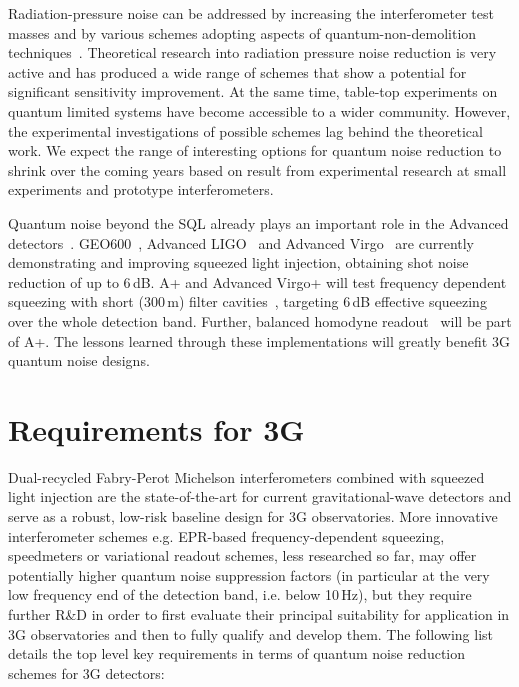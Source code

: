 Radiation-pressure noise can be addressed by increasing the interferometer test masses and by various schemes adopting aspects of quantum-non-demolition techniques~\cite{KLMTV2001,PuCh2002,Che2003,Braginsky:2004fp}. Theoretical research into radiation pressure noise reduction is very active and has produced a wide range of schemes that show a potential for significant sensitivity improvement. At the same time, table-top experiments on quantum limited systems have become accessible to a wider community. However, the experimental investigations of possible schemes lag behind the theoretical work. We expect the range of interesting options for quantum noise reduction to shrink over the coming years based on result from experimental research at small experiments and prototype interferometers.

Quantum noise beyond the SQL already plays an important role in the Advanced detectors~\cite{BuCh2001}. GEO600~\cite{GEO:Squeezing}, Advanced LIGO~\cite{H1:Squeezing,AdvancedLIGO2015} and Advanced Virgo~\cite{AdvancedVirgo2015} are currently demonstrating and improving squeezed light injection, obtaining shot noise reduction of up to 6\,dB. A+ and Advanced Virgo+ will test frequency dependent squeezing with short (300\,m) filter cavities~\cite{Eva2013,TAMA_FDS2016}, targeting 6\,dB effective squeezing over the whole detection band. Further, balanced homodyne readout~\cite{BHD,Stefszky:Balanced2012} will be part of A+. The lessons learned through these implementations will greatly benefit 3G quantum noise designs.

\section{Requirements for 3G}
Dual-recycled Fabry-Perot Michelson interferometers combined with squeezed light injection are the state-of-the-art for current gravitational-wave detectors and serve as a robust, low-risk baseline design for 3G observatories. More innovative interferometer schemes e.g. EPR-based frequency-dependent squeezing, speedmeters or variational readout schemes, less researched so far, 
may offer potentially higher quantum noise suppression factors (in particular at the very low frequency end of the detection band, i.e. below 10\,Hz),  but they require further R\&D 
 in order to first evaluate their principal suitability for application in 3G observatories and then to fully qualify and develop them. 
The following list details the top level  key requirements in terms of quantum noise reduction schemes   for 3G detectors:

